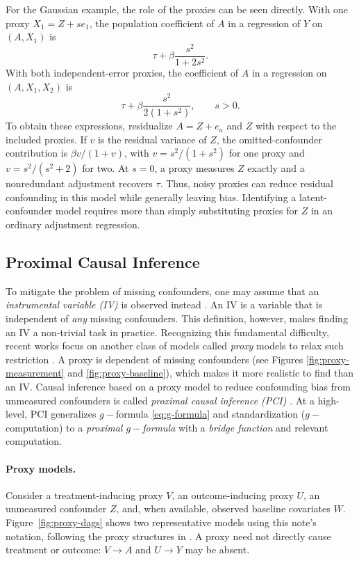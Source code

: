 \documentclass[11pt,twoside]{article}
\begin{document}
For the Gaussian example, the role of the proxies can be seen directly. With one proxy $X_1=Z+s e_1$, the population coefficient of $A$ in a regression of $Y$ on $(A,X_1)$ is
\[
 \tau+\beta\frac{s^2}{1+2s^2}.
\]
With both independent-error proxies, the coefficient of $A$ in a regression on $(A,X_1,X_2)$ is
\[
 \tau+\beta\frac{s^2}{2(1+s^2)},\qquad s>0.
\]
To obtain these expressions, residualize $A=Z+e_a$ and $Z$ with respect to the included proxies. If $v$ is the residual variance of $Z$, the omitted-confounder contribution is $\beta v/(1+v)$, with $v=s^2/(1+s^2)$ for one proxy and $v=s^2/(s^2+2)$ for two. At $s=0$, a proxy measures $Z$ exactly and a nonredundant adjustment recovers $\tau$. Thus, noisy proxies can reduce residual confounding in this model while generally leaving bias. Identifying a latent-confounder model requires more than simply substituting proxies for $Z$ in an ordinary adjustment regression.

\subsection{Proximal Causal Inference}
To mitigate the problem of missing confounders, one may assume that an \emph{instrumental variable (IV)} is observed instead \cite{bowden1990instrumental}. An IV is a variable that is independent of \emph{any} missing confounders. This definition, however, makes finding an IV a non-trivial task in practice. Recognizing this fundamental difficulty, recent works focus on another class of models called \emph{proxy} models to relax such restriction \cite{mastouri2021proximal}. A proxy is dependent of missing confounders (see Figures \ref{fig:proxy-measurement} and \ref{fig:proxy-baseline}), which makes it more realistic to find than an IV. Causal inference based on a proxy model to reduce confounding bias from unmeasured confounders is called \emph{proximal causal inference (PCI)} \cite{miao2018proxy, kuroki2014measurement, mastouri2021proximal, tchetgen2020introduction, kivva2023cross}. At a high-level, PCI generalizes $g-$formula \eqref{eq:g-formula} and standardization ($g-$computation) to a \emph{proximal $g-$formula} with a \emph{bridge function} and relevant computation. 

\paragraph{Proxy models.}
Consider a treatment-inducing proxy $V$, an outcome-inducing proxy $U$, an unmeasured confounder $Z$, and, when available, observed baseline covariates $W$. Figure~\ref{fig:proxy-dags} shows two representative models using this note's notation, following the proxy structures in \cite{mastouri2021proximal,tchetgen2020introduction}. A proxy need not directly cause treatment or outcome: $V\to A$ and $U\to Y$ may be absent.
\end{document}
